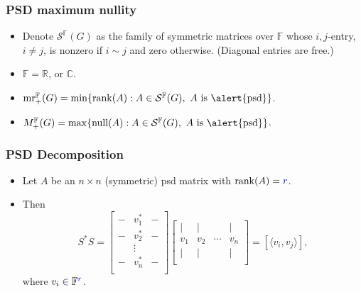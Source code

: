 \documentclass{beamer}
\def \mr {\operatorname{mr}}
\def \rank {\operatorname{rank}}
\def \nul {\operatorname{null}}
\begin{document}

\begin{frame}
\frametitle{PSD maximum nullity}
\begin{itemize}
\item Denote $\mathcal{S}^\mathbb{F}(G)$ as the family of \alert{symmetric} matrices over $\mathbb{F}$ whose $i,j$-entry, \alert{$i\neq j$}, is nonzero if $i\sim j$ and zero otherwise. (Diagonal entries are free.)
\item $\mathbb{F}=\mathbb{R}$, or $\mathbb{C}$.
\item $\mr_+^\mathbb{F}(G)=\min\{\rank(A):A\in \mathcal{S}^\mathbb{F}(G),~A\text{ is \alert{psd}}\}$.
\item $M_+^\mathbb{F}(G)=\max\{\nul(A):A\in \mathcal{S}^\mathbb{F}(G),~A\text{ is \alert{psd}}\}$.
\end{itemize}

\end{frame}


\begin{frame}
\frametitle{PSD Decomposition}
\begin{itemize}
\item Let $A$ be an $n\times n$ (symmetric) psd matrix with $\rank(A)={\color{blue} r}$. 
\item Then 
\[
S^*S=
\begin{bmatrix}
- & v_1^* & - \\
- & v_2^* & - \\
 ~  & \vdots & ~ \\
- & v_n^* & -\\
\end{bmatrix}
\begin{bmatrix}
| & | & ~ & | \\
v_1 & v_2 & \cdots & v_n \\
| & | & ~ & | \\
\end{bmatrix}
=[\langle v_i, v_j \rangle],
\]
where $v_i\in \mathbb{F}^{\color{blue} r}$.
\end{itemize}
\end{frame}

\end{document}
